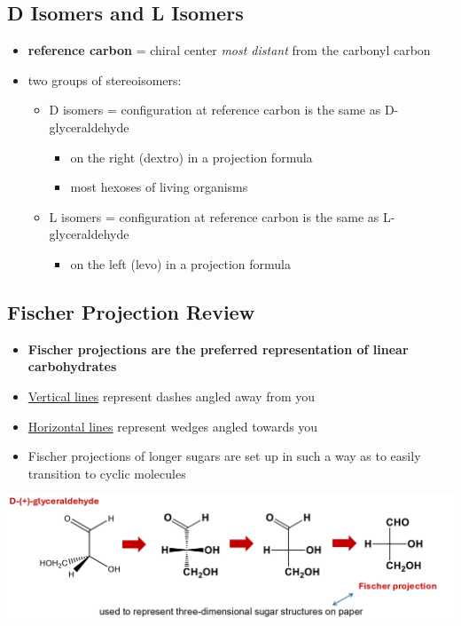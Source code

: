 \documentclass[10pt]{article}
\begin{document}
\subsection*{D Isomers and L Isomers}
\begin{itemize}
    \item \textbf{reference carbon} = chiral center \textit{most distant} from the carbonyl carbon
    \item two groups of stereoisomers:
    \begin{itemize}
        \item D isomers = configuration at reference carbon is the same as D-glyceraldehyde
        \begin{itemize}
            \item on the right (dextro) in a projection formula
            \item most hexoses of living organisms
        \end{itemize}
        \item L isomers = configuration at reference carbon is the same as L-glyceraldehyde
        \begin{itemize}
            \item on the left (levo) in a projection formula
        \end{itemize}
    \end{itemize}
\end{itemize}

\subsection*{Fischer Projection Review}
\begin{itemize}
    \item \textbf{Fischer projections are the preferred representation of linear carbohydrates}
    \item \underline{Vertical lines} represent dashes angled away from you
    \item \underline{Horizontal lines} represent wedges angled towards you
    \item Fischer projections of longer sugars are set up in such a way as to easily transition to cyclic molecules
\end{itemize}
\begin{center}
    \includegraphics*[width=\textwidth]{L1_4.png}
\end{center}
\end{document}
